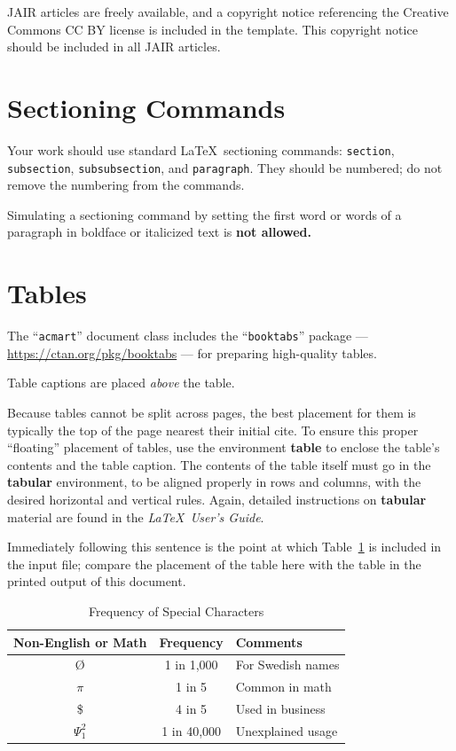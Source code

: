 \documentclass[]{jair}
\begin{document}
JAIR articles are freely available, and a copyright notice referencing the Creative Commons CC BY license is included in the template. This copyright notice should be included in all JAIR articles.

\section{Sectioning Commands}

Your work should use standard \LaTeX\ sectioning commands:
\verb|section|, \verb|subsection|, \verb|subsubsection|, and
\verb|paragraph|. They should be numbered; do not remove the numbering
from the commands.

Simulating a sectioning command by setting the first word or words of
a paragraph in boldface or italicized text is {\bfseries not allowed.}

\section{Tables}

The ``\verb|acmart|'' document class includes the ``\verb|booktabs|''
package --- \url{https://ctan.org/pkg/booktabs} --- for preparing
high-quality tables.

Table captions are placed {\itshape above} the table.

Because tables cannot be split across pages, the best placement for
them is typically the top of the page nearest their initial cite.  To
ensure this proper ``floating'' placement of tables, use the
environment \textbf{table} to enclose the table's contents and the
table caption.  The contents of the table itself must go in the
\textbf{tabular} environment, to be aligned properly in rows and
columns, with the desired horizontal and vertical rules.  Again,
detailed instructions on \textbf{tabular} material are found in the
\textit{\LaTeX\ User's Guide}.

Immediately following this sentence is the point at which
Table~\ref{tab:freq} is included in the input file; compare the
placement of the table here with the table in the printed output of
this document.

\begin{table}
  \caption{Frequency of Special Characters}
  \label{tab:freq}
  \begin{tabular}{@{}ccl@{}}
    \toprule
    Non-English or Math&Frequency&Comments\\
    \midrule
    \O & 1 in 1,000& For Swedish names\\
    $\pi$ & 1 in 5& Common in math\\
    \$ & 4 in 5 & Used in business\\
    $\Psi^2_1$ & 1 in 40,000& Unexplained usage\\
  \bottomrule
\end{tabular}
\end{table}
\end{document}
